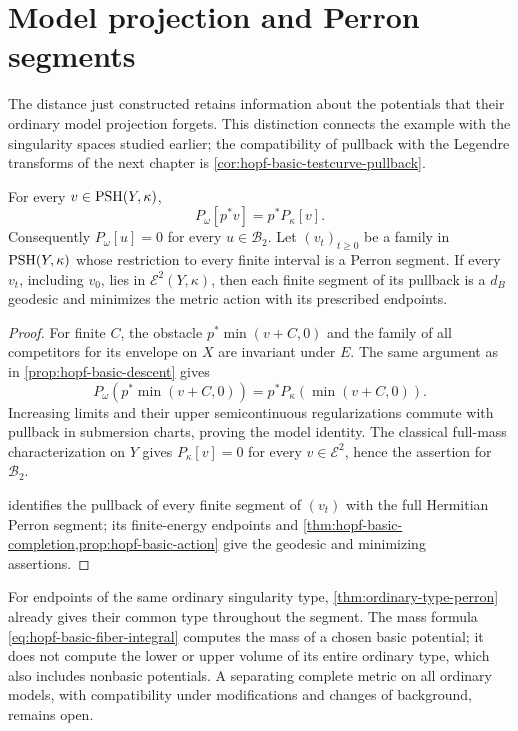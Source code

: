 \section{Model projection and Perron segments}
\label{sec:hopf-basic-models}

The distance just constructed retains information about the potentials that their ordinary model projection forgets. This distinction connects the example with the singularity spaces studied earlier; the compatibility of pullback with the Legendre transforms of the next chapter is \cref{cor:hopf-basic-testcurve-pullback}.

\begin{proposition}\label{prop:hopf-basic-model-projection}
For every $v\in\mathrm{PSH}(Y,\kappa)$,
\[
 P_\omega[p^*v]=p^*P_\kappa[v].
\]
Consequently $P_\omega[u]=0$ for every $u\in\mathcal B_2$. Let $(v_t)_{t\geq0}$ be a family in $\mathrm{PSH}(Y,\kappa)$ whose restriction to every finite interval is a Perron segment. If every $v_t$, including $v_0$, lies in $\mathcal E^2(Y,\kappa)$, then each finite segment of its pullback is a $d_B$ geodesic and minimizes the metric action with its prescribed endpoints.
\end{proposition}
\begin{proof}
For finite $C$, the obstacle $p^*\min(v+C,0)$ and the family of all competitors for its envelope on $X$ are invariant under $E$. The same argument as in \cref{prop:hopf-basic-descent} gives
\[
 P_\omega(p^*\min(v+C,0))
 =p^*P_\kappa(\min(v+C,0)).
\]
Increasing limits and their upper semicontinuous regularizations commute with pullback in submersion charts, proving the model identity. The classical full-mass characterization on $Y$ gives $P_\kappa[v]=0$ for every $v\in\mathcal E^2$, hence the assertion for $\mathcal B_2$.

 identifies the pullback of every finite segment of $(v_t)$ with the full Hermitian Perron segment; its finite-energy endpoints and \cref{thm:hopf-basic-completion,prop:hopf-basic-action} give the geodesic and minimizing assertions.
\end{proof}

For endpoints of the same ordinary singularity type, \cref{thm:ordinary-type-perron} already gives their common type throughout the segment. The mass formula \eqref{eq:hopf-basic-fiber-integral} computes the mass of a chosen basic potential; it does not compute the lower or upper volume of its entire ordinary type, which also includes nonbasic potentials. A separating complete metric on all ordinary models, with compatibility under modifications and changes of background, remains open.
